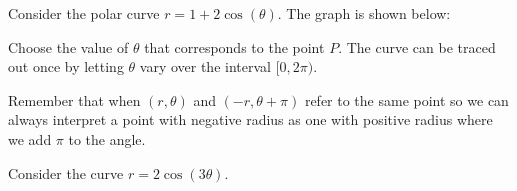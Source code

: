 \documentclass{ximera}
\author{Jason Miller}
\begin{document}
\begin{exercise}



Consider the polar curve $r=1+2\cos(\theta)$. The graph is shown below: 




\begin{image}  
\end{image} 

Choose the value of $\theta$ that corresponds to the point $P$. The curve can be traced out once by letting $\theta$ vary over the interval $[0, 2\pi)$.

\begin{multipleChoice}
\choice{$\pi$}
\end{multipleChoice}


\begin{hint}
Remember that when $(r, \theta)$ and $(-r, \theta + \pi)$ refer to the same point so we can always interpret a point with negative radius as one with 
positive radius where we add $\pi$ to the angle. 
\end{hint}



\begin{exercise}

Consider the curve $r=2\cos(3\theta)$.



\end{exercise}
\end{exercise}
\end{document}
